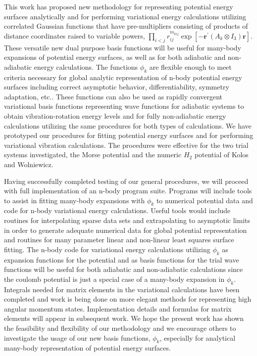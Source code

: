 \documentclass[12pt,thmsa]{article}
\begin{document}
This work has proposed new methodology for representing potential energy
surfaces analytically and for performing variational energy calculations
utilizing correlated Gaussian functions that have pre-multipliers consisting
of products of distance coordinates raised to variable powers, $%
\prod_{i<j}r_{ij}^{m_{kij}}\exp \left[ -\mathbf{r}^{\prime }(A_k\otimes I_3)%
\mathbf{r}\right] $. These versatile new dual purpose basis functions will
be useful for many-body expansions of potential energy surfaces, as well as
for both adiabatic and non-adiabatic energy calculations. The functions $%
\phi _k$ are flexible enough to meet criteria necessary for global analytic
representation of n-body potential energy surfaces including correct
asymptotic behavior, differentiability, symmetry adaptation, etc.. These
functions can also be used as rapidly convergent variational basis functions
representing wave functions for adiabatic systems to obtain
vibration-rotation energy levels and for fully non-adiabatic energy
calculations utilizing the same procedures for both types of calculations.
We have prototyped our procedures for fitting potential energy surfaces and
for performing variational vibration calculations. The procedures were
effective for the two trial systems investigated, the Morse potential and
the numeric $H_2$ potential of Kolos and Wolniewicz\cite{Kolos65}.

Having successfully completed testing of our general procedures, we will
proceed with full implementation of an n-body program suite. Programs will
include tools to assist in fitting many-body expansions with $\phi _k$ to
numerical potential data and code for n-body variational energy
calculations. Useful tools would include routines for interpolating sparse
data sets and extrapolating to asymptotic limits in order to generate
adequate numerical data for global potential representation and routines for
many parameter linear and non-linear least squares surface fitting. The
n-body code for variational energy calculations utilizing $\phi _k$ as
expansion functions for the potential and as basis functions for the trial
wave functions will be useful for both adiabatic and non-adiabatic
calculations since the coulomb potential is just a special case of a
many-body expansion in $\phi _k$. Integrals needed for matrix elements in
the variational calculations have been completed and work is being done on
more elegant methods for representing high angular momentum states.
Implementation details and formulas for matrix elements will appear in
subsequent work. We hope the present work has shown the feasibility and
flexibility of our methodology and we encourage others to investigate the
usage of our new basis functions, $\phi _k$, especially for analytical
many-body representation of potential energy surfaces.



\end{document}
